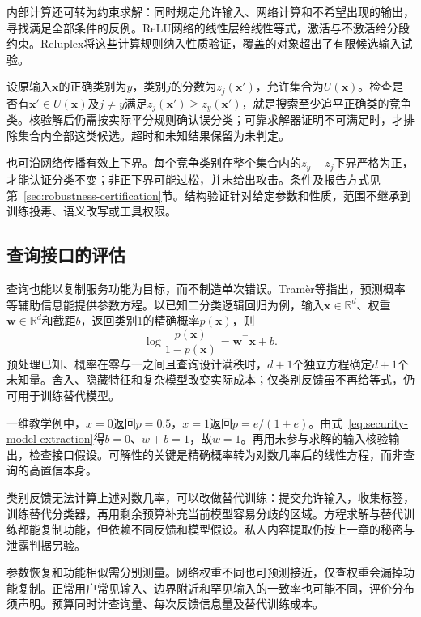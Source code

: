 内部计算还可转为约束求解：同时规定允许输入、网络计算和不希望出现的输出，寻找满足全部条件的反例。ReLU网络的线性层给线性等式，激活与不激活给分段约束。Reluplex将这些计算规则纳入性质验证，覆盖的对象超出了有限候选输入试验。

设原输入$\bm{x}$的正确类别为$y$，类别$j$的分数为$z_j(\bm{x}')$，允许集合为$U(\bm{x})$。检查是否有$\bm{x}'\in U(\bm{x})$及$j\ne y$满足$z_j(\bm{x}')\geq z_y(\bm{x}')$，就是搜索至少追平正确类的竞争类。核验解后仍需按实际平分规则确认误分类；可靠求解器证明不可满足时，才排除集合内全部这类候选。超时和未知结果保留为未判定。

也可沿网络传播有效上下界。每个竞争类别在整个集合内的$z_y-z_j$下界严格为正，才能认证分类不变；非正下界可能过松，并未给出攻击。条件及报告方式见第~\ref{sec:robustness-certification}节。结构验证针对给定参数和性质，范围不继承到训练投毒、语义改写或工具权限。

\subsection{查询接口的评估}
\label{sec:security-information-test}

查询也能以复制服务功能为目标，而不制造单次错误。Tramèr等指出，预测概率等辅助信息能提供参数方程。以已知二分类逻辑回归为例，输入$\bm{x}\in\mathbb R^d$、权重$\bm{w}\in\mathbb R^d$和截距$b$，返回类别1的精确概率$p(\bm{x})$，则
\begin{equation}
 \log\frac{p(\bm{x})}{1-p(\bm{x})}
 =\bm{w}^{\top}\bm{x}+b.
 \label{eq:security-model-extraction}
\end{equation}
预处理已知、概率在零与一之间且查询设计满秩时，$d+1$个独立方程确定$d+1$个未知量。舍入、隐藏特征和复杂模型改变实际成本；仅类别反馈虽不再给等式，仍可用于训练替代模型。

一维教学例中，$x=0$返回$p=0.5$，$x=1$返回$p=e/(1+e)$。由式~\eqref{eq:security-model-extraction}得$b=0$、$w+b=1$，故$w=1$。再用未参与求解的输入核验输出，检查接口假设。可解性的关键是精确概率转为对数几率后的线性方程，而非查询的高置信本身。

类别反馈无法计算上述对数几率，可以改做替代训练：提交允许输入，收集标签，训练替代分类器，再用剩余预算补充当前模型容易分歧的区域。方程求解与替代训练都能复制功能，但依赖不同反馈和模型假设。私人内容提取仍按上一章的秘密与泄露判据另验。

参数恢复和功能相似需分别测量。网络权重不同也可预测接近，仅查权重会漏掉功能复制。正常用户常见输入、边界附近和罕见输入的一致率也可能不同，评价分布须声明。预算同时计查询量、每次反馈信息量及替代训练成本。

